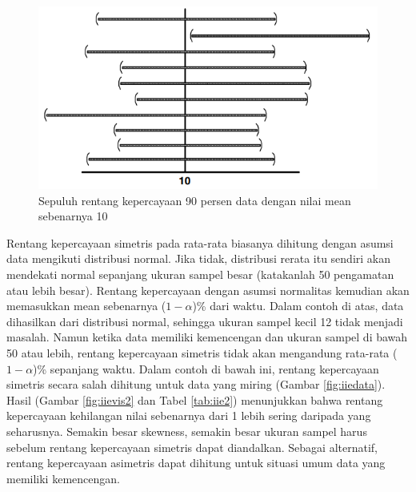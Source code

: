 \documentclass[]{book}
\begin{document}
\begin{figure}

{\centering \includegraphics[width=0.65\linewidth]{iievis} 

}

\caption{Sepuluh rentang kepercayaan 90 persen data dengan nilai mean sebenarnya 10}\label{fig:iievis}
\end{figure}

Rentang kepercayaan simetris pada rata-rata biasanya dihitung dengan
asumsi data mengikuti distribusi normal. Jika tidak, distribusi rerata
itu sendiri akan mendekati normal sepanjang ukuran sampel besar
(katakanlah 50 pengamatan atau lebih besar). Rentang kepercayaan dengan
asumsi normalitas kemudian akan memasukkan mean sebenarnya
(\(1-\alpha\))\% dari waktu. Dalam contoh di atas, data dihasilkan dari
distribusi normal, sehingga ukuran sampel kecil 12 tidak menjadi
masalah. Namun ketika data memiliki kemencengan dan ukuran sampel di
bawah 50 atau lebih, rentang kepercayaan simetris tidak akan mengandung
rata-rata (\(1-\alpha\))\% sepanjang waktu. Dalam contoh di bawah ini,
rentang kepercayaan simetris secara salah dihitung untuk data yang
miring (Gambar \ref{fig:iiedata}). Hasil (Gambar \ref{fig:iievis2} dan
Tabel \ref{tab:iie2}) menunjukkan bahwa rentang kepercayaan kehilangan
nilai sebenarnya dari 1 lebih sering daripada yang seharusnya. Semakin
besar skewness, semakin besar ukuran sampel harus sebelum rentang
kepercayaan simetris dapat diandalkan. Sebagai alternatif, rentang
kepercayaan asimetris dapat dihitung untuk situasi umum data yang
memiliki kemencengan.
\end{document}
